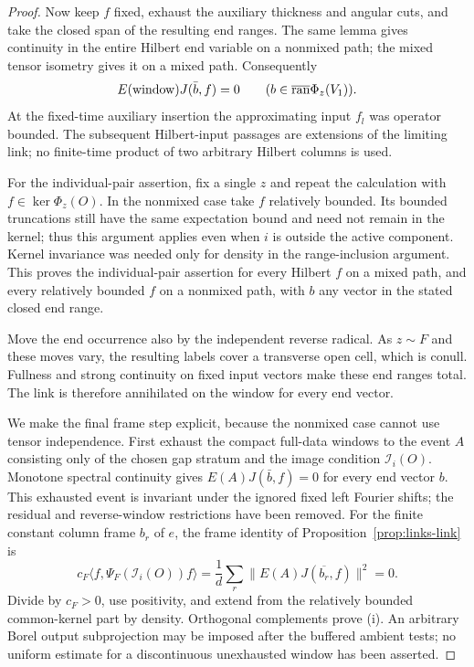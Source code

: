 \begin{proof}
Now keep $f$ fixed, exhaust the auxiliary thickness and angular
cuts, and take the closed span of the resulting end ranges.  The
same lemma gives continuity in the entire Hilbert end variable on
a nonmixed path; the mixed tensor isometry gives it on a mixed
path.  Consequently
\[
 E(\mathrm{window})J(\bar b,f)=0
       \qquad
       (b\in\overline{\operatorname{ran}}\Phi_z(V_1)).
\]
At the fixed-time auxiliary insertion the approximating input $f_l$
was operator bounded.  The subsequent Hilbert-input passages are
extensions of the limiting link; no finite-time product of two
arbitrary Hilbert columns is used.

For the individual-pair assertion, fix a single $z$ and repeat the
calculation with $f\in\ker\Phi_z(O)$.  In the nonmixed case take
$f$ relatively bounded.  Its bounded truncations still have the
same expectation bound and need not remain in the kernel; thus
this argument applies even when $i$ is outside the active component.
Kernel invariance was needed only for density in the range-inclusion
argument.  This proves the individual-pair assertion for every
Hilbert $f$ on a mixed path, and every relatively bounded $f$ on a
nonmixed path, with $b$ any vector in the stated closed end range.

Move the end occurrence also by the independent reverse radical.
As $z\sim F$ and these moves vary, the resulting labels cover a
transverse open cell, which is conull. Fullness and strong continuity
on fixed input vectors make these end ranges total. The link is
therefore annihilated on the window for every end vector.

We make the final frame step explicit, because the nonmixed case
cannot use tensor independence. First exhaust the compact full-data
windows to the event $A$ consisting only of the chosen gap stratum
and the image condition $\mathcal I_i(O)$. Monotone spectral
continuity gives $E(A)J(\bar b,f)=0$ for every end vector $b$.
This exhausted event is invariant under the ignored fixed left
Fourier shifts; the residual and reverse-window restrictions have
been removed. For the finite constant column frame $b_r$ of $e$,
the frame identity of Proposition~\ref{prop:links-link} is
\[
 c_F\langle f,\Psi_F(\mathcal I_i(O))f\rangle
   =\frac1d\sum_r\|E(A)J(\overline{b_r},f)\|^2=0.
\]
Divide by $c_F>0$, use positivity, and extend from the relatively
bounded common-kernel part by density. Orthogonal complements prove
\textup{(i)}. An arbitrary Borel output subprojection may be imposed
after the buffered ambient tests; no uniform estimate for a
discontinuous unexhausted window has been asserted.


\end{proof}
